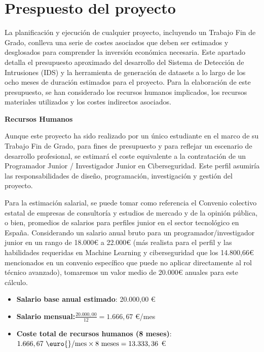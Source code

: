 \section{Prespuesto del proyecto}

La planificación y ejecución de cualquier proyecto, incluyendo un Trabajo Fin de Grado, conlleva una serie de costes asociados que deben ser estimados y desglosados para comprender la inversión económica necesaria. Este apartado detalla el presupuesto aproximado del desarrollo del Sistema de Detección de Intrusiones (IDS) y la herramienta de generación de datasets a lo largo de los ocho meses de duración estimados para el proyecto. Para la elaboración de este presupuesto, se han considerado los recursos humanos implicados, los recursos materiales utilizados y los costes indirectos asociados.

\textbf{Recursos Humanos}

Aunque este proyecto ha sido realizado por un único estudiante en el marco de su Trabajo Fin de Grado, para fines de presupuesto y para reflejar un escenario de desarrollo profesional, se estimará el coste equivalente a la contratación de un Programador Junior / Investigador Junior en Ciberseguridad. Este perfil asumiría las responsabilidades de diseño, programación, investigación y gestión del proyecto.

Para la estimación salarial, se puede tomar como referencia el Convenio colectivo estatal de empresas de consultoría y estudios de mercado y de la opinión pública, o bien, promedios de salarios para perfiles junior en el sector tecnológico en España. Considerando un salario anual bruto para un programador/investigador junior en un rango de 18.000€ a 22.000€ (más realista para el perfil y las habilidades requeridas en Machine Learning y ciberseguridad que los 14.800,66€ mencionados en un convenio específico que puede no aplicar directamente al rol técnico avanzado), tomaremos un valor medio de 20.000€ anuales para este cálculo.
\begin{itemize}

    \item\textbf{Salario base anual estimado}: 20.000,00 \euro{}
    
    \item \textbf{Salario mensual:}$\displaystyle \frac{20.000,00}{12} = 1.666,67 $ \euro{}/mes
   
    \item\textbf{Coste total de recursos humanos (8 meses)}:$\displaystyle 1.666,67 \text{ \euro{}/mes} \times 8 \text{ meses} = 13.333,36 $ \euro{}

\end{itemize}

